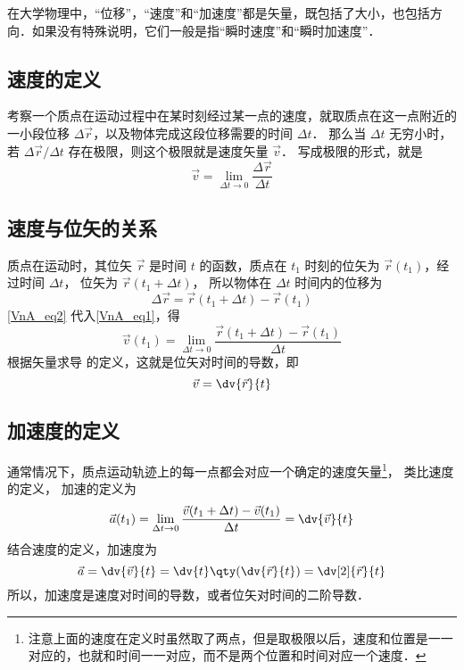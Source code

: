 

在大学物理中，“位移”，“速度”和“加速度”都是矢量，既包括了大小，也包括方向．如果没有特殊说明，它们一般是指“瞬时速度”和“瞬时加速度”．

\subsection{速度的定义}
考察一个质点在运动过程中在某时刻经过某一点的速度，就取质点在这一点附近的一小段位移 $\Delta\vec r$，以及物体完成这段位移需要的时间 $\Delta t$． 那么当 $\Delta t$ 无穷小时，若 $\Delta \vec r/\Delta t$ 存在极限，则这个极限就是速度矢量 $\vec v$． 写成极限的形式，就是
\begin{equation}\label{VnA_eq1}
\vec v = \lim_{\Delta t \to 0} \frac{\Delta \vec r}{\Delta t}
\end{equation}

\subsection{速度与位矢的关系}

质点在运动时，其位矢 $\vec r$ 是时间 $t$ 的函数，质点在 $t_1$ 时刻的位矢为 $\vec r(t_1)$，经过时间 $\Delta t$， 位矢为 $\vec r(t_1 + \Delta t)$， 所以物体在 $\Delta t$ 时间内的位移为
\begin{equation}\label{VnA_eq2}
\Delta \vec r = \vec r (t_1 + \Delta t) - \vec r (t_1)
\end{equation}
\autoref{VnA_eq2} 代入\autoref{VnA_eq1}，得
\begin{equation}\label{VnA_eq3}
\vec v(t_1) = \lim_{\Delta t \to 0} \frac{\vec r (t_1 + \Delta t) - \vec r(t_1)}{\Delta t}
\end{equation}
根据矢量求导 的定义，这就是位矢对时间的导数，即
\begin{equation}
\vec v = \dv{\vec r}{t}
\end{equation}


\subsection{加速度的定义}

通常情况下，质点运动轨迹上的每一点都会对应一个确定的速度矢量\footnote{注意上面的速度在定义时虽然取了两点，但是取极限以后，速度和位置是一一对应的，也就和时间一一对应，而不是两个位置和时间对应一个速度．}， 类比速度的定义， 加速的定义为
\begin{equation}
\vec a(t_1) = \lim_{\Delta t \to 0} \frac{\vec v(t_1 + \Delta t) - \vec v (t_1)}{\Delta t} = \dv{\vec v}{t}
\end{equation}
结合速度的定义，加速度为
\begin{equation}
\vec a = \dv{\vec v}{t} = \dv{t} \qty( \dv{\vec r}{t} ) = \dv[2]{\vec r}{t}
\end{equation}
所以，加速度是速度对时间的导数，或者位矢对时间的二阶导数．

